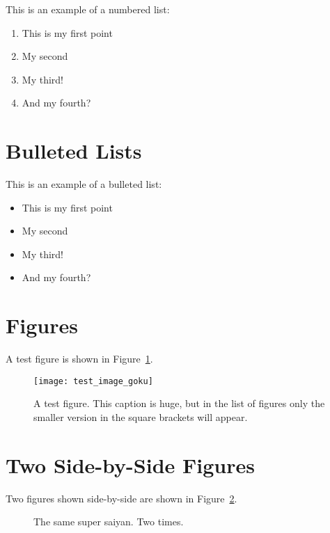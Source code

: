 This is an example of a numbered list:

\begin{enumerate}
	\item This is my first point
	\item My second
	\item My third!
	\item And my fourth?
\end{enumerate}

\blindtext

\section{Bulleted Lists}

This is an example of a bulleted list:

\begin{itemize}
	\item This is my first point
	\item My second
	\item My third!
	\item And my fourth?
\end{itemize}

\blindtext

\section{Figures}

A test figure is shown in Figure~\ref{fig:test1}.

\begin{figure}[ht!] %
	\centering
	\texttt{[image: test\_image\_goku]}
	\caption[This is the short caption for List of Figures]{A test figure.  This caption is huge, but in the list of figures only the smaller version in the square brackets will appear.}
	\label{fig:test1}
\end{figure}

\blindtext

\section{Two Side-by-Side Figures}

Two figures shown side-by-side are shown in Figure~\ref{fig:test2}.

\begin{figure}[!ht]
	\centering
	\qquad
	\caption[Short Caption]{The same super saiyan. Two times.}        
	\label{fig:test2}
\end{figure}


